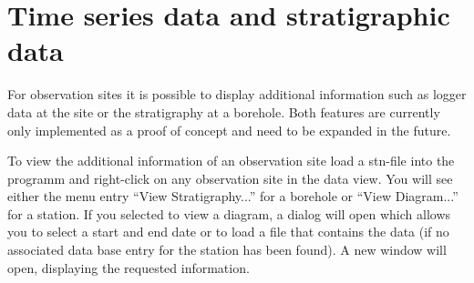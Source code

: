 \section{Time series data and stratigraphic data}

For observation sites it is possible to display additional information such as logger data at the site or the stratigraphy at a borehole. Both features are currently only implemented as a proof of concept and need to be expanded in the future.

To view the additional information of an observation site load a stn-file into the programm and right-click on any observation site in the data view. You will see either the menu entry ``View Stratigraphy...'' for a borehole or ``View Diagram...'' for a station. If you selected to view a diagram, a dialog will open which allows you to select a start and end date or to load a file that contains the data (if no associated data base entry for the station has been found). A new window will open, displaying the requested information.

